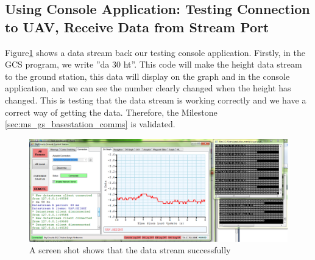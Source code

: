\subsection{Using Console Application: Testing Connection to UAV, Receive Data from Stream Port}
\label{sec:testing_receive_stream}
Figure\ref{test screenshot} shows a data stream back our testing console application.
Firstly, in the GCS program, we write ''da 30 ht''. 
This code will make the height data stream to the ground station, this data will display on the graph and in the console application, and we can see the number clearly changed when the height has changed.
This is testing that the data stream is working correctly and we have a correct way of getting the data.
Therefore, the Milestone \ref{sec:ms_gs_basestation_comms} is validated.
\begin{figure}[H]
\begin{center}
\includegraphics[width=1.00\textwidth]{testing_screenshots/test_data.png} 
\end{center}
\caption{A screen shot shows that the data stream successfully\label{test screenshot}}
\end{figure}

